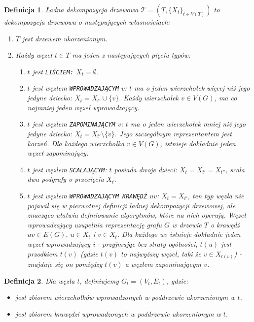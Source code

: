\documentclass[12pt, oneside]{report}
\newtheorem{definition}{Definicja}
\begin{document}
\begin{definition}
\em \emph{Ładna dekompozycja drzewowa} $\mathcal{T} = (T, \{X_t\}_{t \in V(T)})$ to dekompozycja drzewowa o następujących własnościach:
\begin{enumerate}[label=(\roman*)]
	\item{$T$ jest drzewem ukorzenionym.}
	\item{Każdy węzeł $t \in T$ ma jeden z następujących pięciu typów:}
	\begin{enumerate}[label=\arabic*)]
		\item{$t$ jest \texttt{LIŚCIEM:} $X_t = \emptyset$.}
		\item{$t$ jest węzłem \texttt{WPROWADZAJĄCYM} $v$: $t$ ma o jeden wierzchołek więcej niż jego jedyne dziecko: $X_t = X_{t'} \cup \{v\}$. Każdy wierzchołek $v \in V(G)$, ma co najmniej jeden węzeł wprowadzający.}
		\item{$t$ jest węzłem \texttt{ZAPOMINAJĄCYM} $v$: $t$ ma o jeden wierzchołek mniej niż jego jedyne dziecko: $X_t = X_{t'} \setminus \{v\}$. Jego szczególnym reprezentantem jest korzeń. Dla każdego wierzchołka $v \in V(G)$, istnieje dokładnie jeden węzeł zapominający.}
		\item{$t$ jest węzłem \texttt{SCALAJĄCYM}: $t$ posiada dwoje dzieci: $X_t = X_{t'} = X_{t''}$, scala dwa podgrafy o przecięciu $X_t$.}
		\item{$t$ jest węzłem \texttt{WPROWADZAJĄCYM KRAWĘDŹ} $uv$: $X_t = X_{t'}$, ten typ węzła nie pojawił się w pierwotnej definicji ładnej dekompozycji drzewowej, ale znacząco ułatwia definiowanie algorytmów, które na nich operują. Węzeł wprowadzający uzupełnia reprezentację grafu $G$ w drzewie $T$ o krawędź $uv \in E(G)$, $u \in X_t$ i $v \in X_t$. Dla każdego $uv$ istnieje dokładnie jeden węzeł wprowadzający i - przyjmując bez straty ogólności, $t(u)$ jest przodkiem $t(v)$ (gdzie $t(v)$ to najwyższy węzeł, taki że $v \in X_{t(v)}$) - znajduje się on pomiędzy $t(v)$ a węzłem zapominającym $v$.}
\end{enumerate}
\end{enumerate}
\end{definition}

\begin{definition}
\em Dla węzła $t$, definiujemy $G_t = (V_t, E_t)$, gdzie: 
\begin{itemize}[noitemsep,topsep=5pt,parsep=0pt,partopsep=0pt]
\item[$V_t$]{jest zbiorem wierzchołków wprowadzonych w poddrzewie ukorzenionym w $t$.}
\item[$E_t$]{jest zbiorem krawędzi wprowadzonych w poddrzewie ukorzenionym w $t$.} 
\end{itemize}
\end{definition}
\end{document}
